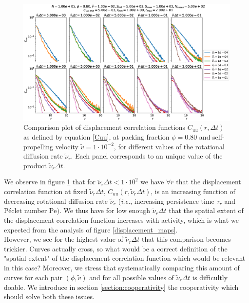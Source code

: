 \documentclass[class=report, float=false, crop=false]{standalone}
\begin{document}
\begin{figure}[h!]
\centering
\includegraphics[width=\textwidth]{figures/figs/Cuu_comparison_Dk8000_Vj1000_Nq1000_Cn5000_LINLOG.eps}
\caption{Comparison plot of displacement correlation functions $C_{uu}(r, \Delta t)$ as defined by equation \ref{Cuu}, at packing fraction $\phi = 0.80$ and self-propelling velocity $\tilde{v} = 1\cdot10^{-2}$, for different values of the rotational diffusion rate $\tilde{\nu}_r$. Each panel corresponds to an unique value of the product $\tilde{\nu}_r\Delta t$.}
\label{cuu_comparison}
\end{figure}

We observe in figure \ref{cuu_comparison} that for $\tilde{\nu}_r\Delta t < 1\cdot10^2$ we have $\forall r$ that the displacement correlation function at fixed $\tilde{\nu}_r \Delta t$, $C_{uu}(r, \tilde{\nu}_r \Delta t)$, is an increasing function of decreasing rotational diffusion rate $\tilde{\nu}_r$ (\textit{i.e.}, increasing persistence time $\tau_r$ and P\'eclet number $\text{Pe}$). We thus have for low enough $\tilde{\nu}_r\Delta t$ that the spatial extent of the displacement correlation function increases with activity, which is what we expected from the analysis of figure \ref{displacement_maps}.\\

However, we see for the highest value of $\tilde{\nu}_r\Delta t$ that this comparison becomes trickier. Curves actually cross, so what would be a correct definition of the "spatial extent" of the displacement correlation function which would be relevant in this case? Moreover, we stress that systematically comparing this amount of curves for each pair $(\phi, \tilde{v})$ and for all possible values of $\tilde{\nu}_r\Delta t$ is difficultly doable. We introduce in section \ref{section:cooperativity} the cooperativity which should solve both these issues.
\end{document}
